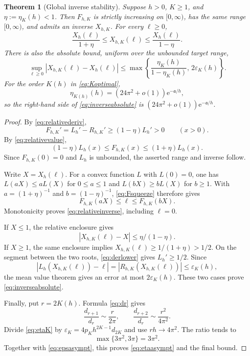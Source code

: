 \documentclass[11pt,a4paper]{article}
\numberwithin{equation}{section}
\newtheorem{theorem}{Theorem}[section]
\theoremstyle{definition}
\newcommand{\ee}{\mathrm e}
\newcommand{\Act}{\mathfrak a}
\newcommand{\eps}{\varepsilon}
\begin{document}
\begin{theorem}[Global inverse stability]
\label{thm:inverse}
Suppose $h>0$, $K\ge1$, and $\eta:=\eta_K(h)<1$. Then $F_{h,K}$ is strictly increasing on $[0,\infty)$, has the same range $[0,\infty)$, and admits an inverse $X_{h,K}$. For every $\ell\ge0$,
\begin{equation}
\frac{X_h(\ell)}{1+\eta}
 \le X_{h,K}(\ell)
 \le\frac{X_h(\ell)}{1-\eta}.
\label{eq:relativeinverse}
\end{equation}
There is also the absolute bound, uniform over the unbounded target range,
\begin{equation}
\boxed{\displaystyle
\sup_{\ell\ge0}|X_{h,K}(\ell)-X_h(\ell)|
 \le\max\left\{\frac{\eta_K(h)}{1-\eta_K(h)},\,2\eps_K(h)\right\}.}
\label{eq:inverseabsolute}
\end{equation}
For the order $K(h)$ in \eqref{eq:Koptimal},
\begin{equation}
\eta_{K(h)}(h)=(24\pi^2+o(1))\ee^{-\Act/h},
\label{eq:etaasympt}
\end{equation}
so the right-hand side of \eqref{eq:inverseabsolute} is
$(24\pi^2+o(1))\ee^{-\Act/h}$.
\end{theorem}
\begin{proof}
By \eqref{eq:relativederiv},
\[
F_{h,K}'=L_h'-R_{h,K}'\ge(1-\eta)L_h'>0
\qquad(x>0).
\]
By \eqref{eq:relativevalue},
\begin{equation}
(1-\eta)L_h(x)\le F_{h,K}(x)\le(1+\eta)L_h(x).
\label{eq:Fsqueeze}
\end{equation}
Since $F_{h,K}(0)=0$ and $L_h$ is unbounded, the asserted range and inverse follow.

Write $X=X_h(\ell)$. For a convex function $L$ with $L(0)=0$, one has
$L(aX)\le aL(X)$ for $0\le a\le1$ and $L(bX)\ge bL(X)$ for $b\ge1$. With $a=(1+\eta)^{-1}$ and $b=(1-\eta)^{-1}$, \eqref{eq:Fsqueeze} therefore gives
\[
F_{h,K}(aX)\le\ell\le F_{h,K}(bX).
\]
Monotonicity proves \eqref{eq:relativeinverse}, including $\ell=0$.

If $X\le1$, the relative enclosure gives
\[
|X_{h,K}(\ell)-X|\le\eta/(1-\eta).
\]
If $X\ge1$, the same enclosure implies $X_{h,K}(\ell)\ge1/(1+\eta)>1/2$. On the segment between the two roots, \eqref{eq:derlower} gives $L_h'\ge1/2$. Since
\[
|L_h(X_{h,K}(\ell))-\ell|
=|R_{h,K}(X_{h,K}(\ell))|\le\eps_K(h),
\]
the mean value theorem gives an error at most $2\eps_K(h)$. These two cases prove \eqref{eq:inverseabsolute}.

Finally, put $r=2K(h)$. Formula \eqref{eq:dr} gives
\[
\frac{d_{r+1}}{d_r}\sim\frac r{2\pi},\qquad
\frac{d_{r+2}}{d_r}\sim\frac{r^2}{4\pi^2}.
\]
Divide \eqref{eq:etaK} by $\eps_K=4p_Kh^{2K-1}d_{2K}$ and use $rh\to4\pi^2$. The ratio tends to
\[
\max\{3\pi^2,3\pi\}=3\pi^2.
\]
Together with \eqref{eq:epsasympt}, this proves \eqref{eq:etaasympt} and the final bound.
\end{proof}
\end{document}
